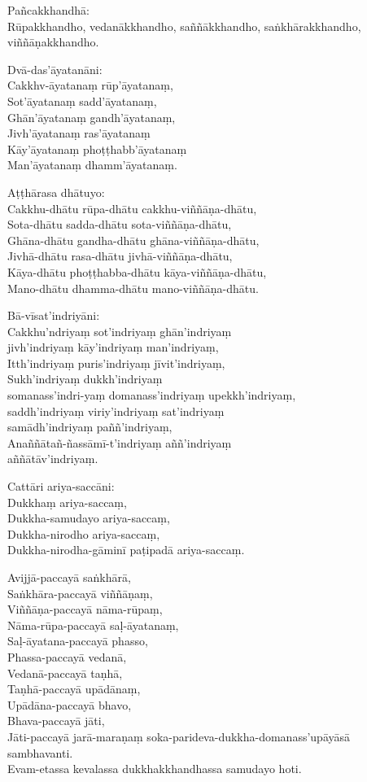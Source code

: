 
Pañcakkhandhā:\\
Rūpakkhandho, vedanākkhandho, saññākkhandho, saṅkhārakkhandho, viññāṇakkhandho.

Dvā-das'āyatanāni:\\
Cakkhv-āyatanaṃ rūp'āyatanaṃ,\\
Sot'āyatanaṃ sadd'āyatanaṃ,\\
Ghān'āyatanaṃ gandh'āyatanaṃ,\\
Jivh'āyatanaṃ ras'āyatanaṃ\\
Kāy'āyatanaṃ phoṭṭhabb'āyatanaṃ\\
Man'āyatanaṃ dhamm'āyatanaṃ.

Aṭṭhārasa dhātuyo:\\
Cakkhu-dhātu rūpa-dhātu cakkhu-viññāṇa-dhātu,\\
Sota-dhātu sadda-dhātu sota-viññāṇa-dhātu,\\
Ghāna-dhātu gandha-dhātu ghāna-viññāṇa-dhātu,\\
Jivhā-dhātu rasa-dhātu jivhā-viññāṇa-dhātu,\\
Kāya-dhātu phoṭṭhabba-dhātu kāya-viññāṇa-dhātu,\\
Mano-dhātu dhamma-dhātu mano-viññāṇa-dhātu.

Bā-vīsat'indriyāni:\\
Cakkhu'ndriyaṃ sot'indriyaṃ ghān'indriyaṃ\\
jivh'indriyaṃ kāy'indriyaṃ man'indriyaṃ,\\
Itth'indriyaṃ puris'indriyaṃ jīvit'indriyaṃ,\\
Sukh'indriyaṃ dukkh'indriyaṃ\\
somanass'indri-yaṃ domanass'indriyaṃ upekkh'indriyaṃ,\\
saddh'indriyaṃ viriy'indriyaṃ sat'indriyaṃ\\
samādh'indriyaṃ paññ'indriyaṃ,\\
Anaññātañ-ñassāmī-t'indriyaṃ aññ'indriyaṃ\\
aññātāv'indriyaṃ.

Cattāri ariya-saccāni:\\
Dukkhaṃ ariya-saccaṃ,\\
Dukkha-samudayo ariya-saccaṃ,\\
Dukkha-nirodho ariya-saccaṃ,\\
Dukkha-nirodha-gāminī paṭipadā ariya-saccaṃ.

Avijjā-paccayā saṅkhārā,\\
Saṅkhāra-paccayā viññāṇaṃ,\\
Viññāṇa-paccayā nāma-rūpaṃ,\\
Nāma-rūpa-paccayā saḷ-āyatanaṃ,\\
Saḷ-āyatana-paccayā phasso,\\
Phassa-paccayā vedanā,\\
Vedanā-paccayā taṇhā,\\
Taṇhā-paccayā upādānaṃ,\\
Upādāna-paccayā bhavo,\\
Bhava-paccayā jāti,\\
Jāti-paccayā jarā-maraṇaṃ soka-parideva-dukkha-domanass'upāyāsā sambhavanti.\\
Evam-etassa kevalassa dukkhakkhandhassa samudayo hoti.

